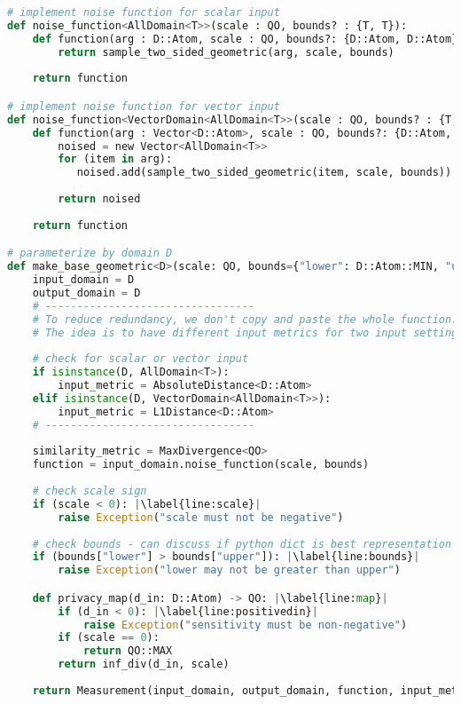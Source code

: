 \documentclass[11pt,a4paper]{article}
\begin{document}
\begin{lstlisting}[language=Python,  escapechar=|]
# implement noise function for scalar input 
def noise_function<AllDomain<T>>(scale : QO, bounds? : {T, T}):
    def function(arg : D::Atom, scale : QO, bounds?: {D::Atom, D::Atom}) -> <D, QO>: |\label{line:fn}|
        return sample_two_sided_geometric(arg, scale, bounds)
        
    return function

# implement noise function for vector input  
def noise_function<VectorDomain<AllDomain<T>>(scale : QO, bounds? : {T, T}):
    def function(arg : Vector<D::Atom>, scale : QO, bounds?: {D::Atom, D::Atom}) -> <D, QO>: |\label{line:fn}|
        noised = new Vector<AllDomain<T>>
        for (item in arg):
           noised.add(sample_two_sided_geometric(item, scale, bounds))
          
        return noised
           
    return function

# parameterize by domain D
def make_base_geometric<D>(scale: QO, bounds={"lower": D::Atom::MIN, "upper": D::Atom::MAX}):
    input_domain = D
    output_domain = D
    # ---------------------------------
    # To reduce redundancy, we don't copy and paste the whole function.
    # The idea is to have different input metrics for two input settings.
    
    # check for scalar or vector input
    if isinstance(D, AllDomain<T>):
        input_metric = AbsoluteDistance<D::Atom> 
    elif isinstance(D, VectorDomain<AllDomain<T>>):
        input_metric = L1Distance<D::Atom>
    # ---------------------------------
    
    similarity_metric = MaxDivergence<QO>
    function = input_domain.noise_function(scale, bounds)
    
    # check scale sign
    if (scale < 0): |\label{line:scale}|
        raise Exception("scale must not be negative")
        
    # check bounds - can discuss if python dict is best representation of this
    if (bounds["lower"] > bounds["upper"]): |\label{line:bounds}|
        raise Exception("lower may not be greater than upper")

    def privacy_map(d_in: D::Atom) -> QO: |\label{line:map}|
        if (d_in < 0): |\label{line:positivedin}|
            raise Exception("sensitivity must be non-negative")
        if (scale == 0):
            return QO::MAX
        return inf_div(d_in, scale)
    
    return Measurement(input_domain, output_domain, function, input_metric, similarity_metric, privacy_map)

\end{lstlisting}
\end{document}
